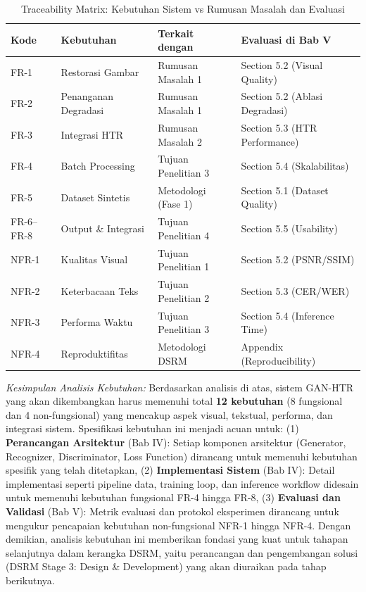 \documentclass[12pt,a4paper]{book}
\begin{document}
\begin{table}[htbp!]
\centering
\small
\caption{Traceability Matrix: Kebutuhan Sistem vs Rumusan Masalah dan Evaluasi}
\label{tab:traceability-matrix}
\begin{tabular}{p{}p{}p{}p{}}
\toprule
\textbf{Kode} & \textbf{Kebutuhan} & \textbf{Terkait dengan} & \textbf{Evaluasi di Bab V} \\
\midrule
FR-1 & Restorasi Gambar & Rumusan Masalah 1 & Section 5.2 (Visual Quality) \\
\midrule
FR-2 & Penanganan Degradasi & Rumusan Masalah 1 & Section 5.2 (Ablasi Degradasi) \\
\midrule
FR-3 & Integrasi HTR & Rumusan Masalah 2 & Section 5.3 (HTR Performance) \\
\midrule
FR-4 & Batch Processing & Tujuan Penelitian 3 & Section 5.4 (Skalabilitas) \\
\midrule
FR-5 & Dataset Sintetis & Metodologi (Fase 1) & Section 5.1 (Dataset Quality) \\
\midrule
FR-6--FR-8 & Output \& Integrasi & Tujuan Penelitian 4 & Section 5.5 (Usability) \\
\midrule
NFR-1 & Kualitas Visual & Tujuan Penelitian 1 & Section 5.2 (PSNR/SSIM) \\
\midrule
NFR-2 & Keterbacaan Teks & Tujuan Penelitian 2 & Section 5.3 (CER/WER) \\
\midrule
NFR-3 & Performa Waktu & Tujuan Penelitian 3 & Section 5.4 (Inference Time) \\
\midrule
NFR-4 & Reproduktifitas & Metodologi DSRM & Appendix (Reproducibility) \\
\bottomrule
\end{tabular}
\end{table}

\textit{Kesimpulan Analisis Kebutuhan:} Berdasarkan analisis di atas, sistem GAN-HTR yang akan dikembangkan harus memenuhi total \textbf{12 kebutuhan} (8 fungsional dan 4 non-fungsional) yang mencakup aspek visual, tekstual, performa, dan integrasi sistem. Spesifikasi kebutuhan ini menjadi acuan untuk: (1) \textbf{Perancangan Arsitektur} (Bab IV): Setiap komponen arsitektur (Generator, Recognizer, Discriminator, Loss Function) dirancang untuk memenuhi kebutuhan spesifik yang telah ditetapkan, (2) \textbf{Implementasi Sistem} (Bab IV): Detail implementasi seperti pipeline data, training loop, dan inference workflow didesain untuk memenuhi kebutuhan fungsional FR-4 hingga FR-8, (3) \textbf{Evaluasi dan Validasi} (Bab V): Metrik evaluasi dan protokol eksperimen dirancang untuk mengukur pencapaian kebutuhan non-fungsional NFR-1 hingga NFR-4. Dengan demikian, analisis kebutuhan ini memberikan fondasi yang kuat untuk tahapan selanjutnya dalam kerangka DSRM, yaitu perancangan dan pengembangan solusi (DSRM Stage 3: Design \& Development) yang akan diuraikan pada tahap berikutnya.
\end{document}
